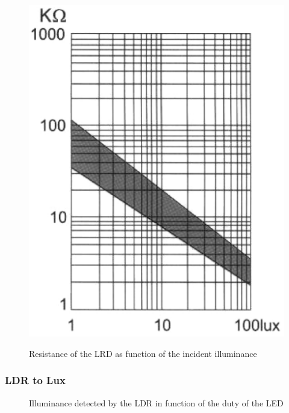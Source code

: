 \begin{figure}[h]
    \centering
    \includegraphics[width=.4\textwidth]{img/LDR_datasheet}
    \caption{}
    \label{fig:LDR_datasheet}
\end{figure}

\begin{figure}[h]
    \centering
    \resizebox{\textwidth}{!}{}
    \caption{Resistance of the LRD as function of the incident illuminance}
    \label{fig:LDR_model}
\end{figure}

\subsubsection{LDR to Lux}
\label{sub:LDRtoLux}

\begin{figure}[h]
    \centering
    \resizebox{\textwidth}{!}{}
    \caption{Illuminance detected by the LDR in function of the duty of the LED}
    \label{fig:pwm_to_lux}
\end{figure}

